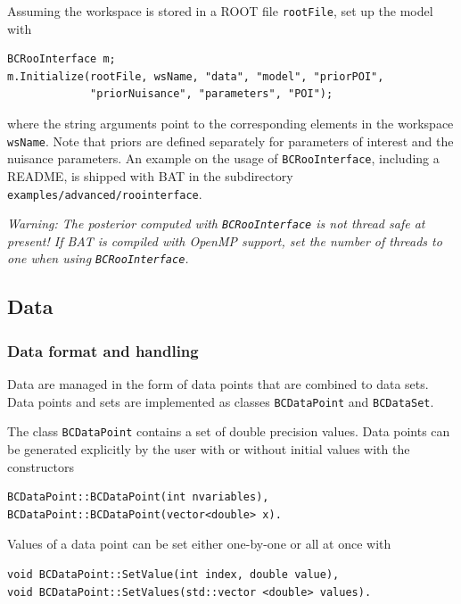 \documentclass[11pt, a4paper]{article}
\begin{document}
Assuming the workspace is stored in a ROOT file \texttt{rootFile}, set
up the model with
\begin{verbatim}
BCRooInterface m;
m.Initialize(rootFile, wsName, "data", "model", "priorPOI",
             "priorNuisance", "parameters", "POI");
\end{verbatim}
where the string arguments point to the corresponding elements in the
workspace \texttt{wsName}. Note that priors are defined separately for
parameters of interest and the nuisance parameters. An example on the
usage of \verb|BCRooInterface|, including a README, is shipped with
BAT in the subdirectory \texttt{examples/advanced/roointerface}.

\emph{Warning: The posterior computed with \texttt{BCRooInterface} is
  not thread safe at present! If BAT is compiled with OpenMP support,
  set the number of threads to one when using
  \texttt{BCRooInterface}.}



\subsection{Data}
\label{subsection:data}

\subsubsection{Data format and handling}
\label{subsection:dataformat}

Data are managed in the form of data points that are combined to data
sets. Data points and sets are implemented as classes
\verb|BCDataPoint| and \verb|BCDataSet|.

The class \verb|BCDataPoint| contains a set of double precision
values. Data points can be generated explicitly by the user with or
without initial values with the constructors
%
\begin{verbatim}
BCDataPoint::BCDataPoint(int nvariables),
BCDataPoint::BCDataPoint(vector<double> x).
\end{verbatim}

Values of a data point can be set either one-by-one or all at once
with
%
\begin{verbatim}
void BCDataPoint::SetValue(int index, double value),
void BCDataPoint::SetValues(std::vector <double> values).
\end{verbatim}
\end{document}
